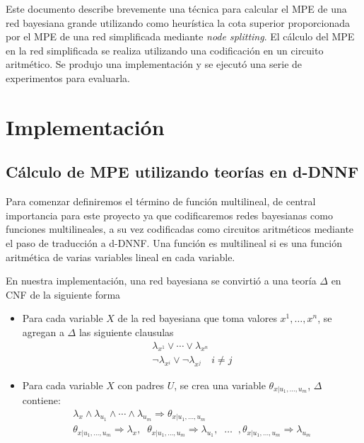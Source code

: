 \documentclass[11pt, letterpaper]{article}
\begin{document}
Este documento describe brevemente una técnica
para calcular el MPE
de una red bayesiana grande utilizando como heurística la cota superior
proporcionada por el MPE de una red simplificada mediante \emph{node splitting}.
El cálculo del MPE en la red simplificada se realiza utilizando una
codificación en un circuito aritmético. Se produjo una implementación y se
ejecutó una serie de experimentos para evaluarla.

\section{Implementación}

\subsection{Cálculo de MPE utilizando teorías en d-DNNF}
\label{sec:condificacion}

Para comenzar definiremos el término de función multilineal, de central
importancia para este proyecto ya que codificaremos redes bayesianas como
funciones multilineales, a su vez codificadas como circuitos aritméticos
mediante el paso de traducción a d-DNNF. Una función es multilineal si es una
función aritmética de varias variables lineal en cada variable.

En nuestra implementación, una red bayesiana se convirtió a una teoría $\Delta$
en CNF de la
siguiente forma
\begin{itemize}
\item Para cada variable $X$ de la red bayesiana que toma valores
  $x^1,\dots,x^n$, se agregan a $\Delta$ las siguiente clausulas
  \begin{align}
    \lambda_{x^1} \lor \cdots \lor \lambda_{x^n} \label{eq:cnf1} \\
    \neg\lambda_{x^i} \lor \neg\lambda_{x^j} \quad i\neq j \label{eq:cnf2}
  \end{align}
\item Para cada variable $X$ con padres $U$, se crea una variable
  $\theta_{x|u_1,\dots,u_m}$, $\Delta$
  contiene:
  \begin{align}
    \lambda_{x} \land \lambda_{u_1} \land \cdots \land \lambda_{u_m} \Rightarrow \theta_{x|u_1,\dots,u_m} \label{eq::cnf3}\\
    \theta_{x|u_1,\dots,u_m} \Rightarrow \lambda_{x}, \;\; \theta_{x|u_1,\dots,u_m} \Rightarrow \lambda_{u_1} ,\;\; \dots \;\;, \theta_{x|u_1,\dots,u_m} \Rightarrow \lambda_{u_m} \label{eq:cnf4}
  \end{align}
\end{itemize}
\end{document}
